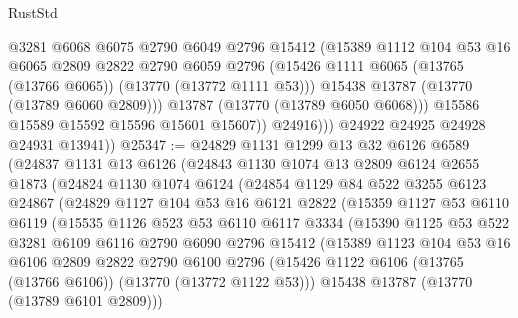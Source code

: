 \begin{lexlean}{RustStd}
\begin{coremodule}
                    @3281
                    @6068
                    @6075
                    @2790
                    @6049
                    @2796
                    @15412
                    (@15389
                      @1112
                      @104
                      @53
                      @16
                      @6065
                      @2809
                      @2822
                      @2790
                      @6059
                      @2796
                      (@15426 @1111 @6065 (@13765 (@13766 @6065)) (@13770 (@13772 @1111 @53)))
                      @15438
                      @13787
                      (@13770 (@13789 @6060 @2809)))
                    @13787
                    (@13770 (@13789 @6050 @6068)))
                  @15586
                  @15589
                  @15592
                  @15596
                  @15601
                  @15607))
              @24916)))
        @24922
        @24925
        @24928
        @24931
        @13941))
@25347 := @24829
    @1131
    @1299
    @13
    @32
    @6126
    @6589
    (@24837
      @1131
      @13
      @6126
      (@24843
        @1130
        @1074
        @13
        @2809
        @6124
        @2655
        @1873
        (@24824
          @1130
          @1074
          @6124
          (@24854
            @1129
            @84
            @522
            @3255
            @6123
            @24867
            (@24829
              @1127
              @104
              @53
              @16
              @6121
              @2822
              (@15359
                @1127
                @53
                @6110
                @6119
                (@15535
                  @1126
                  @523
                  @53
                  @6110
                  @6117
                  @3334
                  (@15390
                    @1125
                    @53
                    @522
                    @3281
                    @6109
                    @6116
                    @2790
                    @6090
                    @2796
                    @15412
                    (@15389
                      @1123
                      @104
                      @53
                      @16
                      @6106
                      @2809
                      @2822
                      @2790
                      @6100
                      @2796
                      (@15426 @1122 @6106 (@13765 (@13766 @6106)) (@13770 (@13772 @1122 @53)))
                      @15438
                      @13787
                      (@13770 (@13789 @6101 @2809)))

\end{coremodule}
\end{lexlean}
